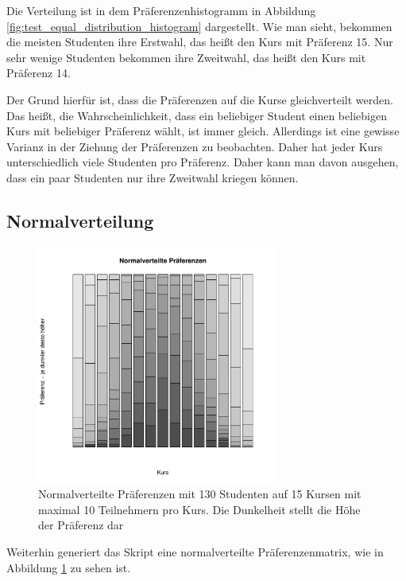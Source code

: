 			Die Verteilung ist in dem Präferenzenhistogramm in Abbildung \ref{fig:test_equal_distribution_histogram} dargestellt.
			Wie man sieht, bekommen die meisten Studenten ihre Erstwahl, das heißt den Kurs mit Präferenz 15.
			Nur sehr wenige Studenten bekommen ihre Zweitwahl, das heißt den Kurs mit Präferenz 14.\newline
			
			Der Grund hierfür ist, dass die Präferenzen auf die Kurse gleichverteilt werden.
			Das heißt, die Wahrscheinlichkeit, dass ein beliebiger Student einen beliebigen Kurs mit beliebiger Präferenz wählt, ist immer gleich.
			Allerdings ist eine gewisse Varianz in der Ziehung der Präferenzen zu beobachten.
			Daher hat jeder Kurs unterschiedlich viele Studenten pro Präferenz.
			Daher kann man davon ausgehen, dass ein paar Studenten nur ihre Zweitwahl kriegen können.\newline
		
		\subsection{Normalverteilung}
		
			\begin{figure}
				\centering
				\includegraphics[width=0.7\textwidth]{./testing/images/NormalDistPreferencesDist.jpg}
				\caption{Normalverteilte Präferenzen mit 130 Studenten auf 15 Kursen mit maximal 10 Teilnehmern pro Kurs. Die Dunkelheit stellt die Höhe der Präferenz dar}
				\label{fig:test_norm_distribution}
			\end{figure}
			Weiterhin generiert das Skript eine normalverteilte Präferenzenmatrix, wie in Abbildung \ref{fig:test_norm_distribution} zu sehen ist.
			
